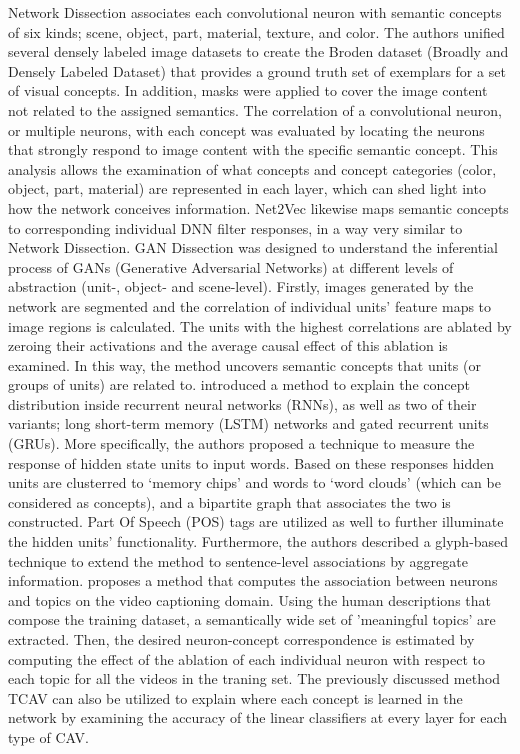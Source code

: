 \documentclass[journal]{IEEEtran}
\begin{document}
Network Dissection \cite{Bau2017} \cite{Zhou2019} \cite{Bau2020} associates each convolutional neuron with semantic concepts of six kinds; scene, object, part, material, texture, and color. The authors unified several densely labeled image datasets to create the Broden dataset (Broadly and Densely Labeled Dataset) that provides a ground truth set of exemplars for a set of visual concepts. In addition, masks were applied to cover the image content not related to the assigned semantics. The correlation of a convolutional neuron, or multiple neurons, with each concept was evaluated by locating the neurons that strongly respond to image content with the specific semantic concept. This analysis allows the examination of what concepts and concept categories (color, object, part, material) are represented in each layer, which can shed light into how the network conceives information.
Net2Vec \cite{Fong2018} likewise maps semantic concepts to corresponding individual DNN filter responses, in a way very similar to Network Dissection. 
GAN Dissection \cite{Bau2018} was designed to understand the inferential process of GANs (Generative Adversarial Networks) at different levels of abstraction (unit-, object- and scene-level). Firstly, images generated by the network are segmented and the correlation of individual units’ feature maps to image regions is calculated. The units with the highest correlations are ablated by zeroing their activations and the average causal effect of this ablation is examined. In this way, the method uncovers semantic concepts that units (or groups of units) are related to. 
\cite{Ming2018} introduced a method to explain the concept distribution inside recurrent neural networks (RNNs), as well as two of their variants; long short-term memory (LSTM) networks and gated recurrent units (GRUs). More specifically, the authors proposed a technique to measure the response of hidden state units to input words. Based on these responses hidden units are clusterred to `memory chips' and words to `word clouds' (which can be considered as concepts), and a bipartite graph that associates the two is constructed. Part Of Speech (POS) tags are utilized as well to further illuminate the hidden units' functionality. Furthermore, the authors described a glyph-based technique to extend the method to sentence-level associations by aggregate information.
\cite{Dong2017} proposes a method that computes the association between neurons and topics on the video captioning domain. Using the human descriptions that compose the training dataset, a semantically wide set of 'meaningful topics' are extracted. Then, the desired neuron-concept correspondence is estimated by computing the effect of the ablation of each individual neuron with respect to each topic for all the videos in the traning set.
The previously discussed method TCAV \cite{Kim2018a} \cite{Kim2018} can also be utilized to explain where each concept is learned in the network by examining the accuracy of the linear classifiers at every layer for each type of CAV.
\end{document}
